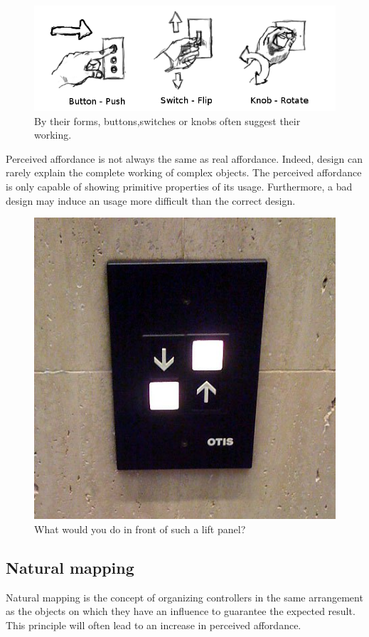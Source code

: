\documentclass[a4paper,11pt] {article}
\theoremstyle{definition}
\begin{document}
\begin{figure}[h]
\centering
\includegraphics[scale=0.40]{fig-report/switches-only.png}
\caption{By their forms, buttons,switches or knobs often suggest their working.}
\end{figure}

Perceived affordance is not always the same as real affordance. Indeed, design can rarely explain the complete working of complex objects. The perceived affordance is only capable of showing primitive properties of its usage. Furthermore, a bad design may induce an usage more difficult than the correct design\cite{affordancesMads}.

\begin{figure}[h]
\centering
\includegraphics[scale=0.20]{fig-report/bad-switches.jpg}
\caption{What would you do in front of such a lift panel?}
\end{figure}

    \subsection{Natural mapping}
Natural mapping is the concept of organizing controllers in the same arrangement as the objects on which they have an influence to guarantee the expected result. This principle will often lead to an increase in perceived affordance.\\
\end{document}
